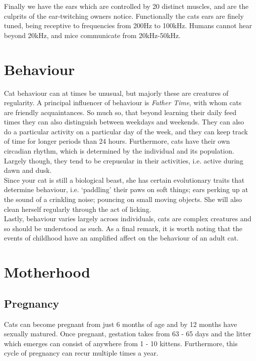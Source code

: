 \documentclass{article}
\begin{document}
Finally we have the ears which are controlled by 20 distinct muscles, and are the culprits of the ear-twitching owners notice. Functionally the cats ears are finely tuned, being receptive to frequencies from 200Hz to 100kHz. Humans cannot hear beyond 20kHz, and mice communicate from 20kHz-50kHz. 

\section*{Behaviour}
Cat behaviour can at times be unusual, but majorly these are creatures of regularity. A principal influencer of behaviour is \emph{Father Time}, with whom cats are friendly acquaintances. So much so, that beyond learning their daily feed times they can also distinguish between weekdays and weekends. They can also do a particular activity on a particular day of the week, and they can keep track of time for longer periods than 24 hours. Furthermore, cats have their own circadian rhythm, which is determined by the individual and its population. Largely though, they tend to be crepusular in their activities, i.e. active during dawn and dusk.\\

Since your cat is still a biological beast, she has certain evolutionary traits that determine behaviour, i.e. `paddling' their paws on soft things; ears perking up at the sound of a crinkling noise; pouncing on small moving objects. She will also clean herself regularly through the act of licking.\\

Lastly, behaviour varies largely across individuals, cats are complex creatures and so should be understood as such. As a final remark, it is worth noting that the events of childhood have an amplified affect on the behaviour of an adult cat.

\section*{Motherhood}

\subsection*{Pregnancy}
Cats can become pregnant from just 6 months of age and by 12 months have sexually matured. Once pregnant, \gls{gestation} takes from 63 - 65 days and the litter which emerges can consist of anywhere from 1 - 10 kittens. Furthermore, this cycle of pregnancy can recur multiple times a year.\\
\end{document}
